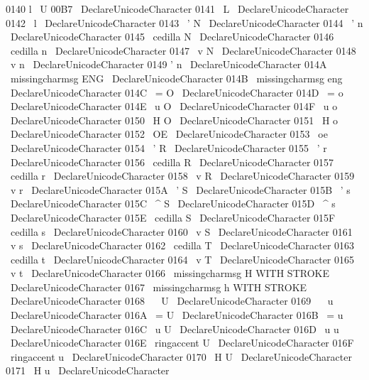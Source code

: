 {{{{{{
0140
}
{
l
\
U
{
00B7
}
}
%
\
DeclareUnicodeCharacter
{
0141
}
{
\
L
}
%
\
DeclareUnicodeCharacter
{
0142
}
{
\
l
}
%
\
DeclareUnicodeCharacter
{
0143
}
{
\
'
N
}
%
\
DeclareUnicodeCharacter
{
0144
}
{
\
'
n
}
%
\
DeclareUnicodeCharacter
{
0145
}
{
\
cedilla
{
N
}
}
%
\
DeclareUnicodeCharacter
{
0146
}
{
\
cedilla
{
n
}
}
%
\
DeclareUnicodeCharacter
{
0147
}
{
\
v
{
N
}
}
%
\
DeclareUnicodeCharacter
{
0148
}
{
\
v
{
n
}
}
%
\
DeclareUnicodeCharacter
{
0149
}
{
'
n
}
%
\
DeclareUnicodeCharacter
{
014A
}
{
\
missingcharmsg
{
ENG
}
}
%
\
DeclareUnicodeCharacter
{
014B
}
{
\
missingcharmsg
{
eng
}
}
%
\
DeclareUnicodeCharacter
{
014C
}
{
\
=
O
}
%
\
DeclareUnicodeCharacter
{
014D
}
{
\
=
o
}
%
\
DeclareUnicodeCharacter
{
014E
}
{
\
u
{
O
}
}
%
\
DeclareUnicodeCharacter
{
014F
}
{
\
u
{
o
}
}
%
%
\
DeclareUnicodeCharacter
{
0150
}
{
\
H
{
O
}
}
%
\
DeclareUnicodeCharacter
{
0151
}
{
\
H
{
o
}
}
%
\
DeclareUnicodeCharacter
{
0152
}
{
\
OE
}
%
\
DeclareUnicodeCharacter
{
0153
}
{
\
oe
}
%
\
DeclareUnicodeCharacter
{
0154
}
{
\
'
R
}
%
\
DeclareUnicodeCharacter
{
0155
}
{
\
'
r
}
%
\
DeclareUnicodeCharacter
{
0156
}
{
\
cedilla
{
R
}
}
%
\
DeclareUnicodeCharacter
{
0157
}
{
\
cedilla
{
r
}
}
%
\
DeclareUnicodeCharacter
{
0158
}
{
\
v
{
R
}
}
%
\
DeclareUnicodeCharacter
{
0159
}
{
\
v
{
r
}
}
%
\
DeclareUnicodeCharacter
{
015A
}
{
\
'
S
}
%
\
DeclareUnicodeCharacter
{
015B
}
{
\
'
s
}
%
\
DeclareUnicodeCharacter
{
015C
}
{
\
^
S
}
%
\
DeclareUnicodeCharacter
{
015D
}
{
\
^
s
}
%
\
DeclareUnicodeCharacter
{
015E
}
{
\
cedilla
{
S
}
}
%
\
DeclareUnicodeCharacter
{
015F
}
{
\
cedilla
{
s
}
}
%
%
\
DeclareUnicodeCharacter
{
0160
}
{
\
v
{
S
}
}
%
\
DeclareUnicodeCharacter
{
0161
}
{
\
v
{
s
}
}
%
\
DeclareUnicodeCharacter
{
0162
}
{
\
cedilla
{
T
}
}
%
\
DeclareUnicodeCharacter
{
0163
}
{
\
cedilla
{
t
}
}
%
\
DeclareUnicodeCharacter
{
0164
}
{
\
v
{
T
}
}
%
\
DeclareUnicodeCharacter
{
0165
}
{
\
v
{
t
}
}
%
\
DeclareUnicodeCharacter
{
0166
}
{
\
missingcharmsg
{
H
WITH
STROKE
}
}
%
\
DeclareUnicodeCharacter
{
0167
}
{
\
missingcharmsg
{
h
WITH
STROKE
}
}
%
\
DeclareUnicodeCharacter
{
0168
}
{
\
~
U
}
%
\
DeclareUnicodeCharacter
{
0169
}
{
\
~
u
}
%
\
DeclareUnicodeCharacter
{
016A
}
{
\
=
U
}
%
\
DeclareUnicodeCharacter
{
016B
}
{
\
=
u
}
%
\
DeclareUnicodeCharacter
{
016C
}
{
\
u
{
U
}
}
%
\
DeclareUnicodeCharacter
{
016D
}
{
\
u
{
u
}
}
%
\
DeclareUnicodeCharacter
{
016E
}
{
\
ringaccent
{
U
}
}
%
\
DeclareUnicodeCharacter
{
016F
}
{
\
ringaccent
{
u
}
}
%
%
\
DeclareUnicodeCharacter
{
0170
}
{
\
H
{
U
}
}
%
\
DeclareUnicodeCharacter
{
0171
}
{
\
H
{
u
}
}
%
\
DeclareUnicodeCharacter
}}}}}
